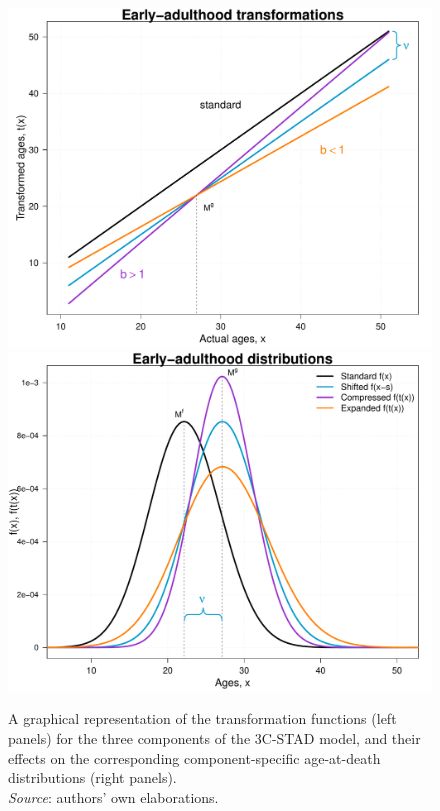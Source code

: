 \documentclass[11pt, a4paper]{article}
\begin{document}
\begin{figure}[h!]
\begin{center}
		\includegraphics[scale=0.32]{./Figures/F3e.pdf}\includegraphics[scale=0.32]{./Figures/F3f.pdf}
		\caption{A graphical representation of the transformation functions (left panels) for the three components of the 3C-STAD model, and their effects on the corresponding component-specific age-at-death distributions (right panels).\\\footnotesize{\textit{Source}: authors' own elaborations.} \label{Fig:STADexample}}
	\end{center}
\end{figure}
\end{document}
